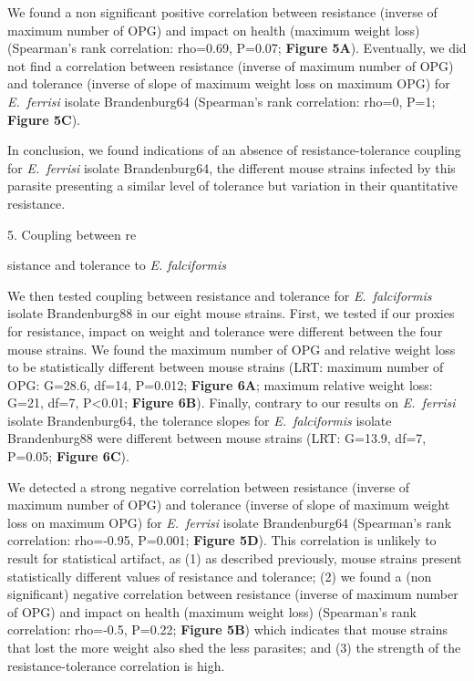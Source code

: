 \documentclass[12pt]{article}
\renewcommand{\_}{\kern-1.5pt\textunderscore\kern-1.5pt}
\begin{document}
\textcolor[HTML]{FF0000}{We found a non significant positive correlation between resistance (inverse of maximum number of OPG) and impact on health (maximum weight loss) (Spearman's rank correlation: rho=0.69, P=0.07; \textbf{Figure 5A}). Eventually, we did not find a correlation between resistance (inverse of maximum number of OPG) and tolerance (inverse of slope of maximum weight loss on maximum OPG) for \textit{E. ferrisi} isolate Brandenburg64 (Spearman's rank correlation: rho=0, P=1; \textbf{Figure 5C}). }\par

\textcolor[HTML]{FF0000}{In conclusion, we found indications of an absence of resistance-tolerance coupling for \textit{E. ferrisi} isolate Brandenburg64, the different mouse strains infected by this parasite presenting a similar level of tolerance but variation in their quantitative resistance.}\par

\begin{FlushLeft}
\textcolor[HTML]{FF0000}{5. Coupling between re}{\fontsize{14pt}{16.8pt}\selectfont \textcolor[HTML]{FF0000}{sistance and tolerance to \textit{E. falciformis}}\par}
\end{FlushLeft}\par

\textcolor[HTML]{FF0000}{We then tested coupling between resistance and tolerance for \textit{E. falciformis} isolate Brandenburg88 in our eight mouse strains. First, we tested if our proxies for resistance, impact on weight and tolerance were different between the four mouse strains. We found the maximum number of OPG and relative weight loss to be statistically different between mouse strains (LRT: maximum number of OPG: G=28.6, df=14, P=0.012; \textbf{Figure 6A}; maximum relative weight loss: G=21, df=7, P<0.01; \textbf{Figure 6B}). Finally, contrary to our results on \textit{E. ferrisi} isolate Brandenburg64, the tolerance slopes for \textit{E. falciformis} isolate Brandenburg88 were different between mouse strains (LRT: G=13.9, df=7, P=0.05; \textbf{Figure 6C}).}\par

\textcolor[HTML]{FF0000}{We detected a strong negative correlation between resistance (inverse of maximum number of OPG) and tolerance (inverse of slope of maximum weight loss on maximum OPG) for \textit{E. ferrisi} isolate Brandenburg64 (Spearman's rank correlation: rho=-0.95, P=0.001; \textbf{Figure 5D}). This correlation is unlikely to result for statistical artifact, as (1) as described previously, mouse strains present statistically different values of resistance and tolerance; (2) we found a (non significant) negative correlation between resistance (inverse of maximum number of OPG) and impact on health (maximum weight loss) (Spearman's rank correlation: rho=-0.5, P=0.22; \textbf{Figure 5B}) which indicates that mouse strains that lost the more weight also shed the less parasites; and (3) the strength of the resistance-tolerance correlation is high.}\par
\end{document}
